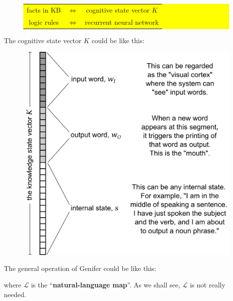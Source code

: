\documentclass[12pt]{article}
\begin{document}
\begin{figure}[H]
\centering
\colorbox{yellow}{\parbox{0.7\textwidth}{
\begin{tabular}{ccc}
facts in KB & $\Leftrightarrow$ & cognitive state vector $K$ \\
logic rules & $\Leftrightarrow$ & recurrent neural network \\
\end{tabular}
}}
\end{figure}

The cognitive state vector $K$ could be like this:
\begin{figure}[H]
\centering
\includegraphics[scale=0.75]{internal-state-K.png}
\end{figure}

The general operation of Genifer could be like this:
\begin{center}
\end{center}
where $\mathcal{L}$ is the ``\textbf{natural-language map}''.  As we shall see, $\mathcal{L}$ is not really needed.
\end{document}
